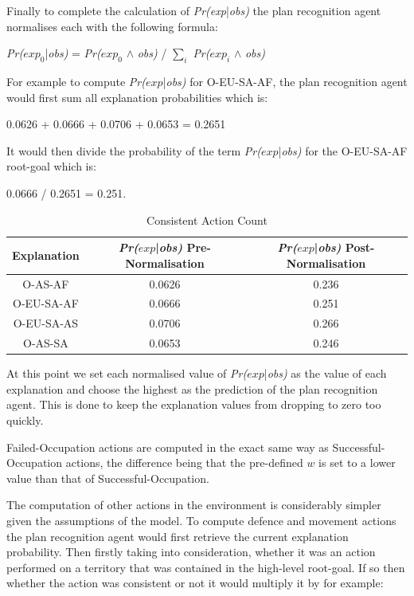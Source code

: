 \documentclass[parskip]{cs4rep}
\begin{document}
\newpage

Finally to complete the calculation of \textit{Pr(exp}|\textit{obs)} the plan recognition agent normalises each with the following formula: \newline

\centerline{
\textit{Pr($exp_0$}|\textit{obs)} = \textit{Pr($exp_0$} $\wedge$ \textit{obs)} / $\displaystyle\sum\nolimits_{i}$ \textit{Pr($exp_i$} $\wedge$ \textit{obs)}
}

For example to compute \textit{Pr($exp$}|\textit{obs)} for O-EU-SA-AF, the plan recognition agent would first sum all explanation probabilities which is:

0.0626 + 0.0666 + 0.0706 + 0.0653 = 0.2651 

It would then divide the probability of the term \textit{Pr($exp$}|\textit{obs)} for the O-EU-SA-AF root-goal which is:

0.0666 / 0.2651 = 0.251.

\begin{table}[ht]
\centering
\begin{tabular}{|c|c|c|}
\hline 
\textbf{Explanation} &  \textit{Pr($exp$}|\textit{obs)} Pre-Normalisation &  \textit{Pr($exp$}|\textit{obs)} Post-Normalisation \\ 
\hline 
O-AS-AF & 0.0626 & 0.236  \\ 
\hline 
O-EU-SA-AF &  0.0666 & 0.251 \\
\hline 
O-EU-SA-AS &  0.0706 & 0.266 \\ 
\hline 
O-AS-SA & 0.0653 & 0.246 \\ 
\hline 
\end{tabular}
\caption{Consistent Action Count}
\label{table:territory-actions-bonus}
\end{table}

At this point we set each normalised value of \textit{Pr($exp$}|\textit{obs)} as the value of each explanation and choose the highest as the prediction of the plan recognition agent. This is done to keep the explanation values from dropping to zero too quickly.

Failed-Occupation actions are computed in the exact same way as Successful-Occupation actions, the difference being that the pre-defined $w$ is set to a lower value than that of Successful-Occupation.

The computation of other actions in the environment is considerably simpler given the assumptions of the model. To compute defence and movement actions the plan recognition agent would first retrieve the current explanation probability. Then firstly taking into consideration, whether it was an action performed on a territory that was contained in the high-level root-goal. If so then whether the action was consistent or not it would multiply it by for example:
\end{document}
